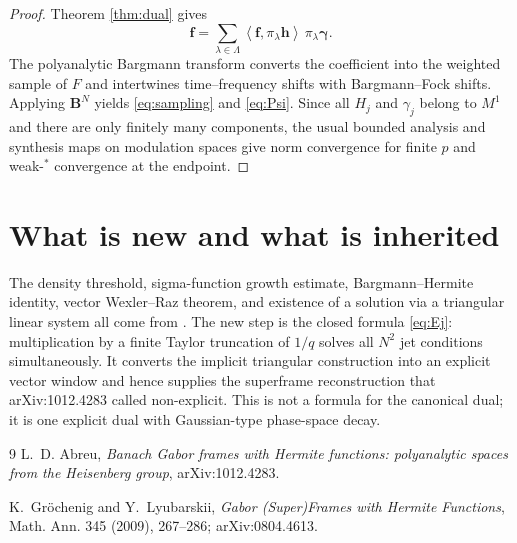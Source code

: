 \documentclass[11pt]{article}
\newcommand{\inner}[2]{\left\langle #1,#2\right\rangle}
\begin{document}
\begin{proof}
Theorem \ref{thm:dual} gives
\[
 \mathbf f=\sum_{\lambda\in\Lambda}
 \inner{\mathbf f}{\pi_\lambda\mathbf h}\,
 \pi_\lambda\boldsymbol\gamma.
\]
The polyanalytic Bargmann transform converts the coefficient into the
weighted sample of $F$ and intertwines time--frequency shifts with
Bargmann--Fock shifts.  Applying $\mathbf B^N$ yields
\eqref{eq:sampling} and \eqref{eq:Psi}.  Since all $H_j$ and $\gamma_j$
belong to $M^1$ and there are only finitely many components, the usual
bounded analysis and synthesis maps on modulation spaces give norm
convergence for finite $p$ and weak-$^*$ convergence at the endpoint.
\end{proof}

\section{What is new and what is inherited}

The density threshold, sigma-function growth estimate, Bargmann--Hermite
identity, vector Wexler--Raz theorem, and existence of a solution via a
triangular linear system all come from \cite{GL}.  The new step is the closed
formula \eqref{eq:Ej}: multiplication by a finite Taylor truncation of
$1/q$ solves all $N^2$ jet conditions simultaneously.  It converts the
implicit triangular construction into an explicit vector window and hence
supplies the superframe reconstruction that arXiv:1012.4283 called
non-explicit.  This is not a formula for the canonical dual; it is one
explicit dual with Gaussian-type phase-space decay.

\begin{thebibliography}{9}
L.~D. Abreu,
\emph{Banach Gabor frames with Hermite functions: polyanalytic spaces from
the Heisenberg group}, arXiv:1012.4283.

K.~Gr\"ochenig and Y.~Lyubarskii,
\emph{Gabor (Super)Frames with Hermite Functions},
Math. Ann. 345 (2009), 267--286; arXiv:0804.4613.
\end{thebibliography}
\end{document}
